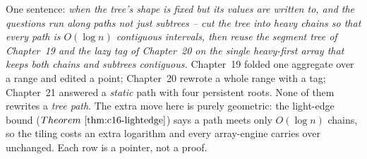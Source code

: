 

One sentence: \emph{when the tree's shape is fixed but its values are written to, and the
questions run along \emph{paths} not just \emph{subtrees} -- cut the tree into heavy chains
so that every path is \(O(\log n)\) contiguous intervals, then reuse the segment tree of
Chapter~19 and the lazy tag of Chapter~20 on the single heavy-first array that keeps
\emph{both} chains and subtrees contiguous.} Chapter~19 folded one aggregate over a range
and edited a point; Chapter~20 rewrote a whole range with a tag; Chapter~21 answered a
\emph{static} path with four persistent roots. None of them rewrites a \emph{tree path}. The
extra move here is purely geometric: the light-edge bound (\(\thmref{c16-lightedge}\)) says a
path meets only \(O(\log n)\) chains, so the tiling costs an extra logarithm and every
array-engine carries over unchanged. Each row is a pointer, not a proof.


